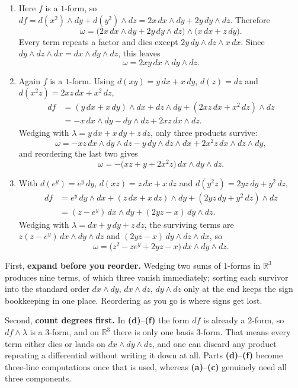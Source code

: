 \begin{exercisesolution}
\begin{enumerate}[label=\textbf{(\alph*)}]
  \item Here $f$ is a $1$-form, so $df = d(x^2)\wedge dy + d(y^2)\wedge dz
    = 2x\,dx\wedge dy + 2y\,dy\wedge dz$. Therefore
    \[\omega = \big(2x\,dx\wedge dy + 2y\,dy\wedge dz\big)\wedge\big(x\,dx + z\,dy\big).\]
    Every term repeats a factor and dies except $2y\,dy\wedge dz\wedge x\,dx$. Since
    $dy\wedge dz\wedge dx = dx\wedge dy\wedge dz$, this leaves
    \[\omega = 2xy\,dx\wedge dy\wedge dz.\]

  \item Again $f$ is a $1$-form. Using $d(xy) = y\,dx + x\,dy$, $d(z) = dz$ and
    $d(x^2z) = 2xz\,dx + x^2\,dz$,
    \begin{align*}
      df &= (y\,dx + x\,dy)\wedge dx + dz\wedge dy + (2xz\,dx + x^2\,dz)\wedge dz \\
         &= -x\,dx\wedge dy - dy\wedge dz + 2xz\,dx\wedge dz.
    \end{align*}
    Wedging with $\lambda = y\,dx + x\,dy + z\,dz$, only three products survive:
    \[\omega = -xz\,dx\wedge dy\wedge dz - y\,dy\wedge dz\wedge dx + 2x^2z\,dx\wedge dz\wedge dy,\]
    and reordering the last two gives
    \[\omega = -\big(xz + y + 2x^2z\big)\,dx\wedge dy\wedge dz.\]

  \item With $d(e^y) = e^y\,dy$, $d(xz) = z\,dx + x\,dz$ and $d(y^2z) = 2yz\,dy + y^2\,dz$,
    \begin{align*}
      df &= e^y\,dy\wedge dx + (z\,dx + x\,dz)\wedge dy + (2yz\,dy + y^2\,dz)\wedge dz \\
         &= (z - e^y)\,dx\wedge dy + (2yz - x)\,dy\wedge dz.
    \end{align*}
    Wedging with $\lambda = dx + y\,dy + z\,dz$, the surviving terms are
    $z(z-e^y)\,dx\wedge dy\wedge dz$ and $(2yz-x)\,dy\wedge dz\wedge dx$, so
    \[\omega = \big(z^2 - ze^y + 2yz - x\big)\,dx\wedge dy\wedge dz.\]
\end{enumerate}
\begin{remark}
First, \textbf{expand before you reorder.} Wedging two sums of $1$-forms in $\mathbb{R}^3$ produces nine
terms, of which three vanish immediately; sorting each survivor into the standard order
$dx\wedge dy$, $dx\wedge dz$, $dy\wedge dz$ only at the end keeps the sign bookkeeping in one
place. Reordering as you go is where signs get lost.

Second, \textbf{count degrees first.} In \textbf{(d)}--\textbf{(f)} the form $df$ is already a $2$-form,
so $df\wedge\lambda$ is a $3$-form, and on $\mathbb{R}^3$ there is only one basis $3$-form. That
means every term either dies or lands on $dx\wedge dy\wedge dz$, and one can discard any product
repeating a differential without writing it down at all. Parts \textbf{(d)}--\textbf{(f)} become
three-line computations once that is used, whereas \textbf{(a)}--\textbf{(c)} genuinely need all
three components.


\end{remark}
\end{exercisesolution}
